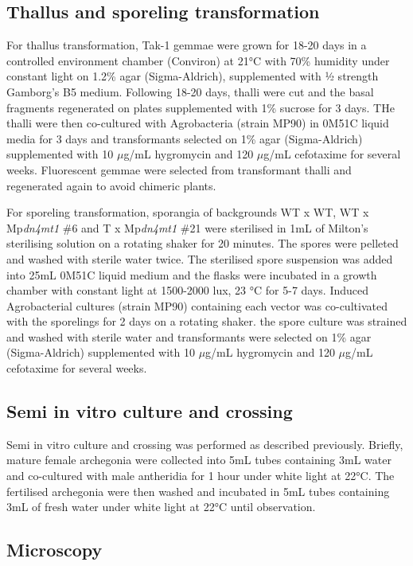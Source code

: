 \subsection{Thallus and sporeling transformation}

For thallus transformation, Tak-1 gemmae were grown for 18-20 days in a controlled environment chamber (Conviron) at 21°C with 70\% humidity under constant light on 1.2\% agar (Sigma-Aldrich), supplemented with ½ strength Gamborg's B5 medium. Following 18-20 days, thalli were cut and the basal fragments regenerated on plates supplemented with 1\% sucrose for 3 days. THe thalli were then co-cultured with Agrobacteria (strain MP90) in 0M51C liquid media for 3 days and transformants selected on 1\% agar (Sigma-Aldrich) supplemented with 10 $\mu$g/mL hygromycin and 120 $\mu$g/mL cefotaxime for several weeks. Fluorescent gemmae were selected from transformant thalli and regenerated again to avoid chimeric plants\citep{RN147}. 

For sporeling transformation, sporangia of backgrounds WT x WT, WT x Mp\textit{dn4mt1} \#6 and T x Mp\textit{dn4mt1} \#21 were sterilised in 1mL of Milton's sterilising solution on a rotating shaker for 20 minutes. The spores were pelleted and washed with sterile water twice. The sterilised spore suspension was added into 25mL 0M51C liquid medium and the flasks were incubated in a growth chamber with constant light at 1500-2000 lux, 23 °C for 5-7 days. Induced Agrobacterial cultures (strain MP90) containing each vector was co-cultivated with the sporelings for 2 days on a rotating shaker. the spore culture was strained and washed with sterile water and transformants were selected on 1\% agar (Sigma-Aldrich) supplemented with 10 $\mu$g/mL hygromycin and 120 $\mu$g/mL cefotaxime for several weeks\citep{RN146}.

\subsection{Semi in vitro culture and crossing}

Semi in vitro culture and crossing was performed as described previously\citep{RN139}. Briefly, mature female archegonia were collected into 5mL tubes containing 3mL water and co-cultured with male antheridia for 1 hour under white light at 22°C. The fertilised archegonia were then washed and incubated in 5mL tubes containing 3mL of fresh water under white light at 22°C until observation.

\subsection{Microscopy} 

